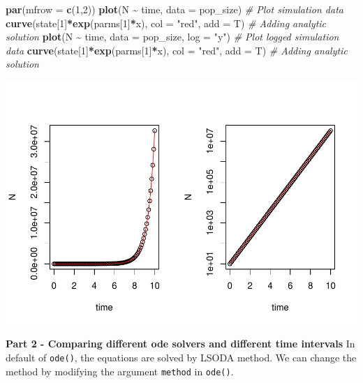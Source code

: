 \documentclass[
]{book}
\newenvironment{Shaded}{\begin{snugshade}}{\end{snugshade}}
\newcommand{\AttributeTok}[1]{\textcolor[rgb]{0.13,0.29,0.53}{#1}}
\newcommand{\CommentTok}[1]{\textcolor[rgb]{0.56,0.35,0.01}{\textit{#1}}}
\newcommand{\DecValTok}[1]{\textcolor[rgb]{0.00,0.00,0.81}{#1}}
\newcommand{\FunctionTok}[1]{\textcolor[rgb]{0.13,0.29,0.53}{\textbf{#1}}}
\newcommand{\NormalTok}[1]{#1}
\newcommand{\SpecialCharTok}[1]{\textcolor[rgb]{0.81,0.36,0.00}{\textbf{#1}}}
\newcommand{\StringTok}[1]{\textcolor[rgb]{0.31,0.60,0.02}{#1}}
\begin{document}
\begin{Shaded}
\begin{Highlighting}[]
\FunctionTok{par}\NormalTok{(}\AttributeTok{mfrow =} \FunctionTok{c}\NormalTok{(}\DecValTok{1}\NormalTok{,}\DecValTok{2}\NormalTok{))}
\FunctionTok{plot}\NormalTok{(N }\SpecialCharTok{\textasciitilde{}}\NormalTok{ time, }\AttributeTok{data =}\NormalTok{ pop\_size) }\CommentTok{\# Plot simulation data}
\FunctionTok{curve}\NormalTok{(state[}\DecValTok{1}\NormalTok{]}\SpecialCharTok{*}\FunctionTok{exp}\NormalTok{(parms[}\DecValTok{1}\NormalTok{]}\SpecialCharTok{*}\NormalTok{x), }\AttributeTok{col =} \StringTok{"red"}\NormalTok{, }\AttributeTok{add =}\NormalTok{ T) }\CommentTok{\# Adding analytic solution}
\FunctionTok{plot}\NormalTok{(N }\SpecialCharTok{\textasciitilde{}}\NormalTok{ time, }\AttributeTok{data =}\NormalTok{ pop\_size, }\AttributeTok{log =} \StringTok{"y"}\NormalTok{) }\CommentTok{\# Plot logged simulation data}
\FunctionTok{curve}\NormalTok{(state[}\DecValTok{1}\NormalTok{]}\SpecialCharTok{*}\FunctionTok{exp}\NormalTok{(parms[}\DecValTok{1}\NormalTok{]}\SpecialCharTok{*}\NormalTok{x), }\AttributeTok{col =} \StringTok{"red"}\NormalTok{, }\AttributeTok{add =}\NormalTok{ T) }\CommentTok{\# Adding analytic solution}
\end{Highlighting}
\end{Shaded}

\includegraphics{bookdown-demo_files/figure-latex/unnamed-chunk-6-1.pdf}

\textbf{Part 2 - Comparing different ode solvers and different time intervals}
In default of \texttt{ode()}, the equations are solved by LSODA method. We can change the method by modifying the argument \texttt{method} in \texttt{ode()}.
\end{document}
